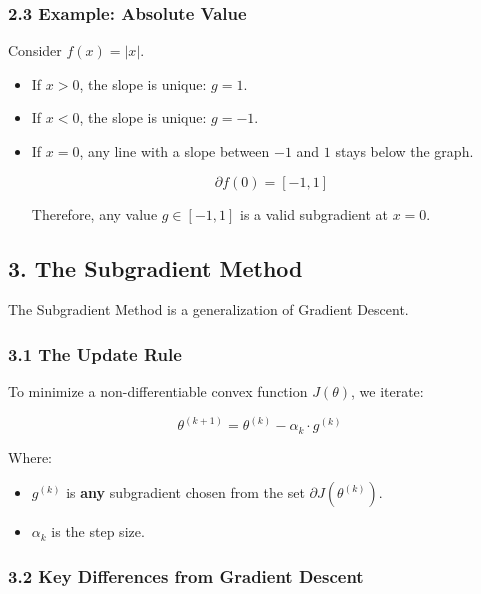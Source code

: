 \documentclass[
  italian,
  11pt,
]{article}
\begin{document}
\subsubsection{2.3 Example: Absolute
Value}\label{example-absolute-value}

Consider \(f(x) = |x|\).

\begin{itemize}
\item
  If \(x > 0\), the slope is unique: \(g = 1\).
\item
  If \(x < 0\), the slope is unique: \(g = -1\).
\item
  If \(x = 0\), any line with a slope between \(-1\) and \(1\) stays
  below the graph.

  \[\partial f(0) = [-1, 1]\]

  Therefore, any value \(g \in [-1, 1]\) is a valid subgradient at
  \(x=0\).
\end{itemize}

\subsection{3. The Subgradient Method}\label{the-subgradient-method}

The Subgradient Method is a generalization of Gradient Descent.

\subsubsection{3.1 The Update Rule}\label{the-update-rule-1}

To minimize a non-differentiable convex function \(J(\theta)\), we
iterate:

\[\theta^{(k+1)} = \theta^{(k)} - \alpha_k \cdot g^{(k)}\]

Where:

\begin{itemize}
\item
  \(g^{(k)}\) is \textbf{any} subgradient chosen from the set
  \(\partial J(\theta^{(k)})\).
\item
  \(\alpha_k\) is the step size.
\end{itemize}

\subsubsection{3.2 Key Differences from Gradient
Descent}\label{key-differences-from-gradient-descent}
\end{document}
